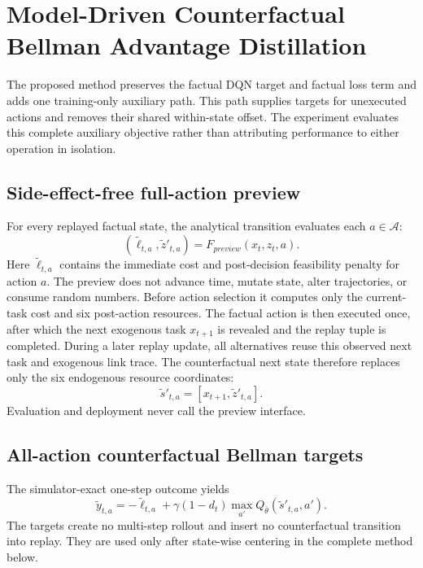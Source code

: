 \documentclass[11pt]{article}
\begin{document}
\section{Model-Driven Counterfactual Bellman Advantage Distillation}
\label{sec:method}

The proposed method preserves the factual DQN target and factual loss term and adds one training-only auxiliary path. This path supplies targets for unexecuted actions and removes their shared within-state offset. The experiment evaluates this complete auxiliary objective rather than attributing performance to either operation in isolation.

\subsection{Side-effect-free full-action preview}

For every replayed factual state, the analytical transition evaluates each $a\in\mathcal A$:
\begin{equation}
(\tilde \ell_{t,a},\tilde z'_{t,a})=F_{preview}(x_t,z_t,a).
\end{equation}
Here $\tilde \ell_{t,a}$ contains the immediate cost and post-decision feasibility penalty for action $a$. The preview does not advance time, mutate state, alter trajectories, or consume random numbers. Before action selection it computes only the current-task cost and six post-action resources. The factual action is then executed once, after which the next exogenous task $x_{t+1}$ is revealed and the replay tuple is completed. During a later replay update, all alternatives reuse this observed next task and exogenous link trace. The counterfactual next state therefore replaces only the six endogenous resource coordinates:
\begin{equation}
\tilde s'_{t,a}=[x_{t+1},\tilde z'_{t,a}].
\end{equation}
Evaluation and deployment never call the preview interface.

\subsection{All-action counterfactual Bellman targets}

The simulator-exact one-step outcome yields
\begin{equation}
\tilde y_{t,a}=-\tilde \ell_{t,a}+\gamma(1-d_t)
\max_{a'}Q_{\bar\theta}(\tilde s'_{t,a},a').
\label{eq:cf_target}
\end{equation}
The targets create no multi-step rollout and insert no counterfactual transition into replay. They are used only after state-wise centering in the complete method below.
\end{document}

